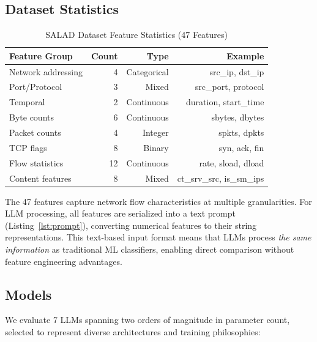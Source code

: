 \documentclass[journal]{IEEEtran}
\begin{document}
\subsection{Dataset Statistics}

\begin{table}[!ht]
\centering
\caption{SALAD Dataset Feature Statistics (47 Features)}
\label{tab:features}
\begin{tabular}{lrrr}
\toprule
\textbf{Feature Group} & \textbf{Count} & \textbf{Type} & \textbf{Example} \\
\midrule
Network addressing & 4 & Categorical & src\_ip, dst\_ip \\
Port/Protocol & 3 & Mixed & src\_port, protocol \\
Temporal & 2 & Continuous & duration, start\_time \\
Byte counts & 6 & Continuous & sbytes, dbytes \\
Packet counts & 4 & Integer & spkts, dpkts \\
TCP flags & 8 & Binary & syn, ack, fin \\
Flow statistics & 12 & Continuous & rate, sload, dload \\
Content features & 8 & Mixed & ct\_srv\_src, is\_sm\_ips \\
\bottomrule
\end{tabular}
\end{table}

The 47 features capture network flow characteristics at multiple granularities. For LLM processing, all features are serialized into a text prompt (Listing~\ref{lst:prompt}), converting numerical features to their string representations. This text-based input format means that LLMs process \emph{the same information} as traditional ML classifiers, enabling direct comparison without feature engineering advantages.

\subsection{Models}
We evaluate 7 LLMs spanning two orders of magnitude in parameter count, selected to represent diverse architectures and training philosophies:
\end{document}
